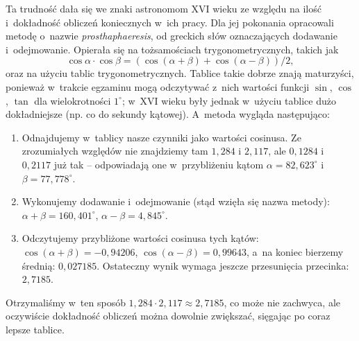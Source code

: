 Ta trudność dała się we znaki astronomom XVI wieku ze względu na ilość i~dokładność obliczeń koniecznych w~ich pracy. Dla jej pokonania opracowali metodę o~nazwie \emph{prosthaphaeresis}, od greckich słów oznaczających dodawanie i~odejmowanie. Opierała się na tożsamościach trygonometrycznych, takich jak 
\[
\cos \alpha \cdot \cos \beta 
= \left( \cos(\alpha+\beta) + \cos(\alpha-\beta) \right) / 2,
\]
oraz na użyciu tablic trygonometrycznych. Tablice takie dobrze znają maturzyści, ponieważ w~trakcie egzaminu mogą odczytywać z~nich wartości funkcji $\sin$, $\cos$, $\tan$ dla wielokrotności $1^\circ$; w~XVI wieku były jednak w~użyciu tablice dużo dokładniejsze (np. co do sekundy kątowej). A~metoda wygląda następująco: 
\begin{enumerate}[nosep]
\item Odnajdujemy w~tablicy nasze czynniki jako wartości cosinusa. Ze zrozumiałych względów nie znajdziemy tam $1{,}284$ i $2{,}117$, ale $0{,}1284$ i $0{,}2117$ już tak -- odpowiadają one w~przybliżeniu kątom $\alpha = 82{,}623^\circ$ i $\beta = 77{,}778^\circ$. 
\item Wykonujemy dodawanie i~odejmowanie (stąd wzięła się nazwa metody): $\alpha + \beta = 160{,}401^\circ$, $\alpha - \beta = 4{,}845^\circ$. 
\item Odczytujemy przybliżone wartości cosinusa tych kątów: $\cos(\alpha + \beta) = -0{,}94206$, $\cos(\alpha-\beta) = 0{,}99643$, a~na koniec bierzemy średnią: $0{,}027185$. Ostateczny wynik wymaga jeszcze przesunięcia przecinka: $2{,}7185$. 
\end{enumerate}
Otrzymaliśmy w~ten sposób $1{,}284 \cdot 2{,}117 \approx 2{,}7185$, co może nie zachwyca, ale oczywiście dokładność obliczeń można dowolnie zwiększać, sięgając po coraz lepsze tablice. 

